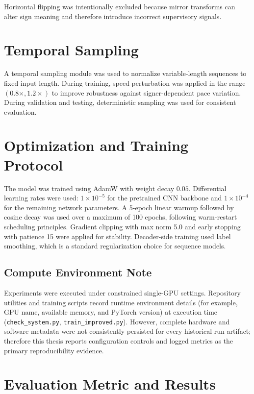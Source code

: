 Horizontal flipping was intentionally excluded because mirror transforms can alter sign meaning and therefore introduce incorrect supervisory signals.

\section{Temporal Sampling}

A temporal sampling module was used to normalize variable-length sequences to fixed input length. During training, speed perturbation was applied in the range $(0.8\times, 1.2\times)$ to improve robustness against signer-dependent pace variation. During validation and testing, deterministic sampling was used for consistent evaluation.

\section{Optimization and Training Protocol}

The model was trained using AdamW with weight decay $0.05$.\cite{loshchilov2019adamw} Differential learning rates were used: $1\times10^{-5}$ for the pretrained CNN backbone and $1\times10^{-4}$ for the remaining network parameters. A 5-epoch linear warmup followed by cosine decay was used over a maximum of 100 epochs, following warm-restart scheduling principles.\cite{loshchilov2017sgdr} Gradient clipping with max norm 5.0 and early stopping with patience 15 were applied for stability. Decoder-side training used label smoothing, which is a standard regularization choice for sequence models.\cite{muller2019labelsmoothing}

\subsection{Compute Environment Note}

Experiments were executed under constrained single-GPU settings. Repository utilities and training scripts record runtime environment details (for example, GPU name, available memory, and PyTorch version) at execution time (\texttt{check\_system.py}, \texttt{train\_improved.py}). However, complete hardware and software metadata were not consistently persisted for every historical run artifact; therefore this thesis reports configuration controls and logged metrics as the primary reproducibility evidence.

\section{Evaluation Metric and Results}


